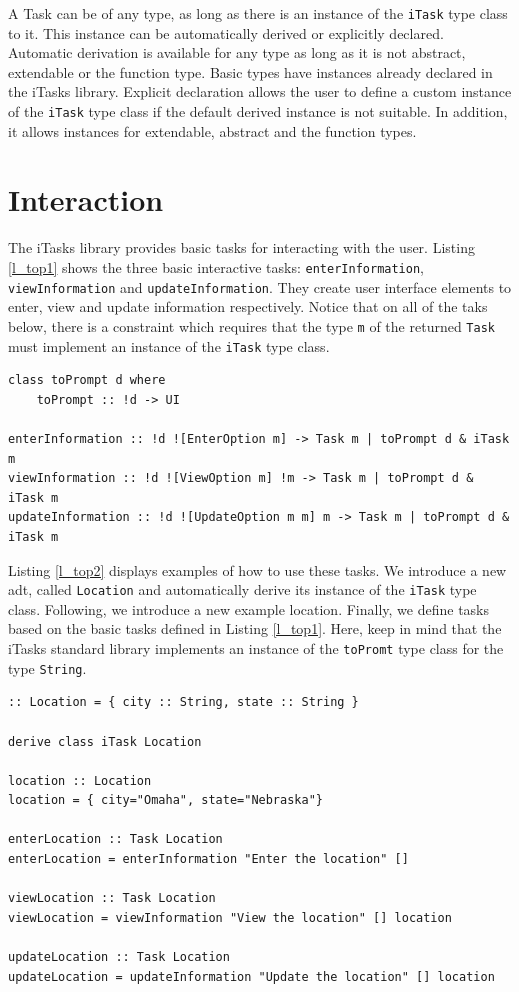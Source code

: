 A Task can be of any type, as long as there is an instance of the \texttt{iTask} type class to it. This instance can be automatically derived or explicitly declared. Automatic derivation is available for any type as long as it is not abstract, extendable or the function type. Basic types have instances already declared in the iTasks library. Explicit declaration allows the user to define a custom instance of the \texttt{iTask} type class if the default derived instance is not suitable. In addition, it allows instances for extendable, abstract and the function types. 

\section{Interaction}\label{interaction}

The iTasks library provides basic tasks for interacting with the user. Listing \ref{l_top1} shows the three basic interactive tasks: \texttt{enterInformation}, \texttt{viewInformation} and \texttt{updateInformation}. They create user interface elements to enter, view and update information respectively. Notice that on all of the taks below, there is a constraint which requires that the type \texttt{m} of the returned \texttt{Task} must implement an instance of the \texttt{iTask} type class. 

\begin{lstlisting}[caption=iTasks basic interaction functions,captionpos=b,label=l_top1]
class toPrompt d where
    toPrompt :: !d -> UI

enterInformation :: !d ![EnterOption m] -> Task m | toPrompt d & iTask m
viewInformation :: !d ![ViewOption m] !m -> Task m | toPrompt d & iTask m
updateInformation :: !d ![UpdateOption m m] m -> Task m | toPrompt d & iTask m 
\end{lstlisting}


Listing \ref{l_top2} displays examples of how to use these tasks. We introduce a new \ac{adt}, called \texttt{Location} and automatically derive its instance of the \texttt{iTask} type class. Following, we introduce a new example location. Finally, we define tasks based on the basic tasks defined in Listing \ref{l_top1}. Here, keep in mind that the iTasks standard library implements an instance of the \texttt{toPromt} type class for the type \texttt{String}.  


\begin{lstlisting}[caption=Example of basic iTask interaction functions,captionpos=b,label=l_top2]
:: Location = { city :: String, state :: String }

derive class iTask Location

location :: Location
location = { city="Omaha", state="Nebraska"}

enterLocation :: Task Location
enterLocation = enterInformation "Enter the location" []

viewLocation :: Task Location
viewLocation = viewInformation "View the location" [] location

updateLocation :: Task Location
updateLocation = updateInformation "Update the location" [] location
\end{lstlisting}


